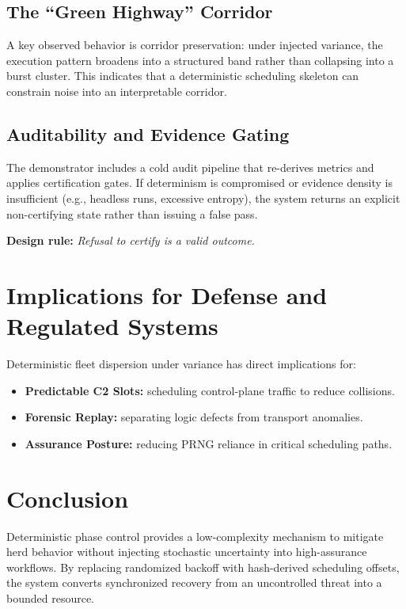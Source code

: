 \documentclass[10pt,twocolumn,letterpaper]{article}
\begin{document}
\subsection{The ``Green Highway'' Corridor}
A key observed behavior is corridor preservation: under injected variance, the execution pattern broadens into a structured band rather than collapsing into a burst cluster. This indicates that a deterministic scheduling skeleton can constrain noise into an interpretable corridor.

\subsection{Auditability and Evidence Gating}
The demonstrator includes a cold audit pipeline that re-derives metrics and applies certification gates. If determinism is compromised or evidence density is insufficient (e.g., headless runs, excessive entropy), the system returns an explicit non-certifying state rather than issuing a false pass.

\noindent \textbf{Design rule:} \emph{Refusal to certify is a valid outcome.}

\section{Implications for Defense and Regulated Systems}
Deterministic fleet dispersion under variance has direct implications for:

\begin{itemize}
\item \textbf{Predictable C2 Slots:} scheduling control-plane traffic to reduce collisions.
\item \textbf{Forensic Replay:} separating logic defects from transport anomalies.
\item \textbf{Assurance Posture:} reducing PRNG reliance in critical scheduling paths.
\end{itemize}

\section{Conclusion}
Deterministic phase control provides a low-complexity mechanism to mitigate herd behavior without injecting stochastic uncertainty into high-assurance workflows. By replacing randomized backoff with hash-derived scheduling offsets, the system converts synchronized recovery from an uncontrolled threat into a bounded resource.
\end{document}
